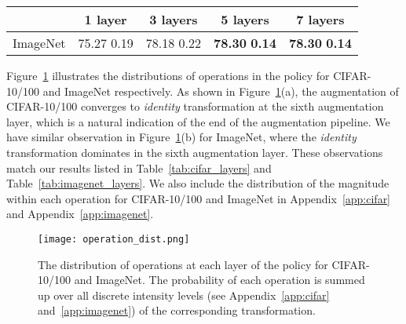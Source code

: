 \vspace{1mm}
\begin{table*}[!h]
\centering
\resizebox{0.7\textwidth}{!}
{
\begin{tabular}{@{}l|c|c|c|c@{}}
\toprule
\multicolumn{1}{l}{\textbf{}} & 
\multicolumn{1}{c}{\textbf{1 layer}} & 
\multicolumn{1}{c}{\textbf{3 layers}} &
\multicolumn{1}{c}{\textbf{5 layers}} &
\multicolumn{1}{c}{\textbf{7 layers}}
\\ 
\midrule
ImageNet & 75.27  0.19 & 78.18  0.22 & \textbf{78.30}  \textbf{0.14} & \textbf{78.30}   \textbf{0.14}  \\
\bottomrule
\end{tabular}
}
\caption{{\small Top-1 test accuracy of \DAA{} on ImageNet with ResNet-50 for different numbers of augmentation layers. The results are averaged over 4 independent runs w/ different initializations with the  confidence interval denoted by .}}
\label{tab:imagenet_layers}
\end{table*}


Figure~\ref{fig:transformation} illustrates the distributions of operations in the policy for CIFAR-10/100 and ImageNet respectively. 
As shown in Figure~\ref{fig:transformation}(a), the augmentation of CIFAR-10/100 converges to \textit{identity} transformation at the sixth augmentation layer, which is a natural indication of the end of the augmentation pipeline. 
We have similar observation in Figure~\ref{fig:transformation}(b) for ImageNet, where the \textit{identity} transformation dominates in the sixth augmentation layer. 
These observations match our results listed in Table~\ref{tab:cifar_layers} and Table~\ref{tab:imagenet_layers}. 
We also include the distribution of the magnitude within each operation for CIFAR-10/100 and ImageNet in Appendix~\ref{app:cifar} and Appendix~\ref{app:imagenet}.



\begin{figure}
\vspace{-10mm}
\centering
\texttt{[image: operation\_dist.png]}
\vspace{-2mm}
\caption{{\small The distribution of operations at each layer of the policy for CIFAR-10/100 and ImageNet. The probability of each operation is summed up over all  discrete intensity levels (see Appendix~\ref{app:cifar} and~\ref{app:imagenet}) of the corresponding transformation.}}
\label{fig:transformation}
\vspace{-3mm}
\end{figure}



